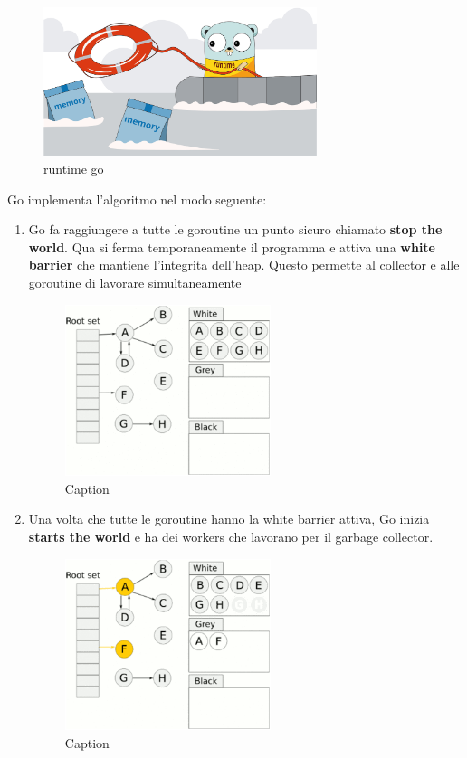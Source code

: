 \begin{figure}[h!]
    \centering
    \includegraphics[width=8cm]{sections/runtime-go.png}
    \caption{runtime go}
    \label{fig:my_label}
\end{figure}

Go implementa l'algoritmo nel modo seguente:

\begin{enumerate}

    \item Go fa raggiungere a tutte le goroutine un punto sicuro chiamato \textbf{stop the world}. Qua si ferma temporaneamente il programma e attiva una \textbf{white barrier} che mantiene l'integrita dell'heap. Questo permette al collector e alle goroutine di lavorare simultaneamente
    
     \begin{figure}[!h]
        \centering
        \includegraphics[width=6cm]{sections/frame0.png}
        \caption{Caption}
        \label{fig:my_label}
    \end{figure}
    
    \item Una volta che tutte le goroutine hanno la white barrier attiva, Go inizia \textbf{starts the world} e ha dei workers che lavorano per il garbage collector.
    
    \begin{figure}[!h]
        \centering
        \includegraphics[width=6cm]{sections/frame1.png}
        \caption{Caption}
        \label{fig:my_label}
    \end{figure}
    

\end{enumerate}
